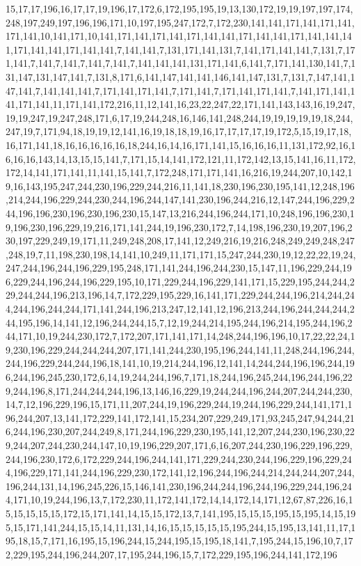 15,17,17,196,16,17,17,19,196,17,172,6,172,195,195,19,13,130,172,19,19,197,197,174,248,197,249,197,196,196,171,10,197,195,247,172,7,172,230,141,141,171,141,171,141,171,141,10,141,171,10,141,171,141,171,141,171,141,141,171,141,141,171,141,141,141,171,141,141,171,141,141,7,141,141,7,131,171,141,131,7,141,171,141,141,7,131,7,171,141,7,141,7,141,7,141,7,141,7,141,141,141,131,171,141,6,141,7,171,141,130,141,7,131,147,131,147,141,7,131,8,171,6,141,147,141,141,146,141,147,131,7,131,7,147,141,147,141,7,141,141,141,7,171,141,171,141,7,171,141,7,171,141,171,141,7,141,171,141,141,171,141,11,171,141,172,216,11,12,141,16,23,22,247,22,171,141,143,143,16,19,247,19,19,247,19,247,248,171,6,17,19,244,248,16,146,141,248,244,19,19,19,19,19,18,244,247,19,7,171,94,18,19,19,12,141,16,19,18,18,19,16,17,17,17,17,19,172,5,15,19,17,18,16,171,141,18,16,16,16,16,16,18,244,16,14,16,171,141,15,16,16,16,11,131,172,92,16,16,16,16,143,14,13,15,15,141,7,171,15,14,141,172,121,11,172,142,13,15,141,16,11,172,172,14,141,171,141,11,141,15,141,7,172,248,171,171,141,16,216,19,244,207,10,142,19,16,143,195,247,244,230,196,229,244,216,11,141,18,230,196,230,195,141,12,248,196,214,244,196,229,244,230,244,196,244,147,141,230,196,244,216,12,147,244,196,229,244,196,196,230,196,230,196,230,15,147,13,216,244,196,244,171,10,248,196,196,230,19,196,230,196,229,19,216,171,141,244,19,196,230,172,7,14,198,196,230,19,207,196,230,197,229,249,19,171,11,249,248,208,17,141,12,249,216,19,216,248,249,249,248,247,248,19,7,11,198,230,198,14,141,10,249,11,171,171,15,247,244,230,19,12,22,22,19,24,247,244,196,244,196,229,195,248,171,141,244,196,244,230,15,147,11,196,229,244,196,229,244,196,244,196,229,195,10,171,229,244,196,229,141,171,15,229,195,244,244,229,244,244,196,213,196,14,7,172,229,195,229,16,141,171,229,244,244,196,214,244,244,244,196,244,244,171,141,244,196,213,247,12,141,12,196,213,244,196,244,244,244,244,195,196,14,141,12,196,244,244,15,7,12,19,244,214,195,244,196,214,195,244,196,244,171,10,19,244,230,172,7,172,207,171,141,171,14,248,244,196,196,10,17,22,22,24,19,230,196,229,244,244,244,207,171,141,244,230,195,196,244,141,11,248,244,196,244,244,196,229,244,244,196,18,141,10,19,214,244,196,12,141,14,244,244,196,196,244,196,244,196,245,230,172,6,14,19,244,244,196,7,171,18,244,196,245,244,196,244,196,229,244,196,8,171,244,244,244,196,13,146,16,229,19,244,244,196,244,207,244,244,230,14,7,12,196,229,196,15,171,11,207,244,19,196,229,244,19,244,196,229,244,141,171,196,244,207,13,141,172,229,141,172,141,15,234,207,229,249,171,93,245,247,94,244,216,244,196,230,207,244,249,8,171,244,196,229,230,195,141,12,207,244,230,196,230,229,244,207,244,230,244,147,10,19,196,229,207,171,6,16,207,244,230,196,229,196,229,244,196,230,172,6,172,229,244,196,244,141,171,229,244,230,244,196,229,196,229,244,196,229,171,141,244,196,229,230,172,141,12,196,244,196,244,214,244,244,207,244,196,244,131,14,196,245,226,15,146,141,230,196,244,244,196,244,196,229,244,196,244,171,10,19,244,196,13,7,172,230,11,172,141,172,14,14,172,14,171,12,67,87,226,16,15,15,15,15,15,172,15,171,141,14,15,15,172,13,7,141,195,15,15,15,195,15,195,14,15,195,15,171,141,244,15,15,14,11,131,14,16,15,15,15,15,15,195,244,15,195,13,141,11,17,195,18,15,7,171,16,195,15,196,244,15,244,195,15,195,18,141,7,195,244,15,196,10,7,172,229,195,244,196,244,207,17,195,244,196,15,7,172,229,195,196,244,141,172,196